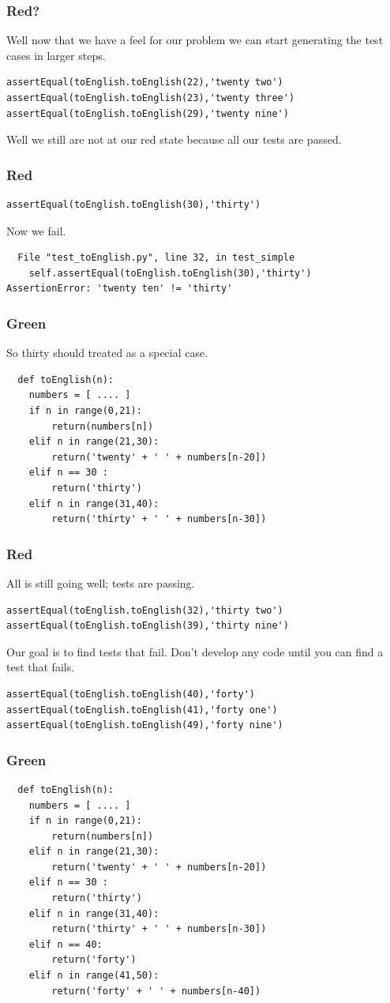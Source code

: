 \documentclass{beamer}
\begin{document}
\begin{frame}[fragile]
\frametitle{Red?}
Well now that we have a feel for our problem we can start generating
the test cases in larger steps.
\begin{lstlisting}
assertEqual(toEnglish.toEnglish(22),'twenty two')
assertEqual(toEnglish.toEnglish(23),'twenty three')
assertEqual(toEnglish.toEnglish(29),'twenty nine')
\end{lstlisting}
Well we still are not at our red state because all our tests are
passed.
\end{frame}
\begin{frame}[fragile]
\frametitle{Red}
\begin{lstlisting}
assertEqual(toEnglish.toEnglish(30),'thirty')
\end{lstlisting}
Now we fail.
\begin{verbatim}
  File "test_toEnglish.py", line 32, in test_simple
    self.assertEqual(toEnglish.toEnglish(30),'thirty')
AssertionError: 'twenty ten' != 'thirty'
\end{verbatim}  
\end{frame}
\begin{frame}[fragile]
  \frametitle{Green}
So thirty should  treated as a special case.
\begin{lstlisting}
  def toEnglish(n):
    numbers = [ .... ]
    if n in range(0,21):
        return(numbers[n])
    elif n in range(21,30):
        return('twenty' + ' ' + numbers[n-20])
    elif n == 30 :
        return('thirty')
    elif n in range(31,40):
        return('thirty' + ' ' + numbers[n-30])
\end{lstlisting}
\end{frame}
\begin{frame}[fragile]
\frametitle{Red}
All is still going well; tests are passing. 
\begin{lstlisting}
assertEqual(toEnglish.toEnglish(32),'thirty two')
assertEqual(toEnglish.toEnglish(39),'thirty nine')
\end{lstlisting}
Our goal is to find tests that fail. Don't develop any code until you
can find a test that fails.
\begin{lstlisting}
assertEqual(toEnglish.toEnglish(40),'forty')
assertEqual(toEnglish.toEnglish(41),'forty one')
assertEqual(toEnglish.toEnglish(49),'forty nine')
\end{lstlisting}
\end{frame}
\begin{frame}[fragile]
  \frametitle{Green}
\begin{lstlisting}
  def toEnglish(n):
    numbers = [ .... ]
    if n in range(0,21):
        return(numbers[n])
    elif n in range(21,30):
        return('twenty' + ' ' + numbers[n-20])
    elif n == 30 :
        return('thirty')
    elif n in range(31,40):
        return('thirty' + ' ' + numbers[n-30])
    elif n == 40:
        return('forty')
    elif n in range(41,50):
        return('forty' + ' ' + numbers[n-40])
\end{lstlisting}
\end{frame}
\end{document}
